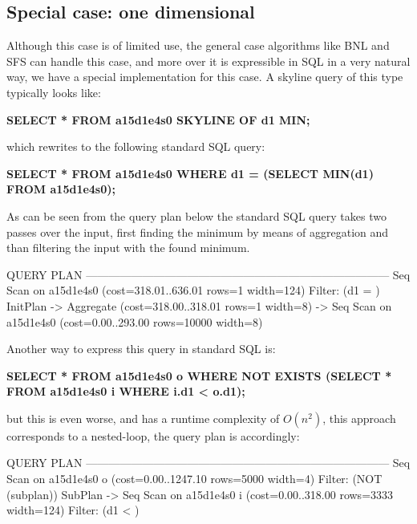 \subsection{Special case: one dimensional}
\label{sec:onedim-nondistinct}
Although this case is of limited use, the general case algorithms like
BNL and SFS can handle this case, and more over it is expressible in
SQL in a very natural way, we have a special implementation for this
case.  A skyline query of this type typically looks like:

\begin{interactive}
\textbf{SELECT * FROM a15d1e4s0 SKYLINE OF d1 MIN;}
\end{interactive}

\noindent
which rewrites to the following standard SQL query:

\begin{interactive}
\textbf{SELECT * FROM a15d1e4s0 WHERE d1 = (SELECT MIN(d1) FROM a15d1e4s0);}
\end{interactive}

\noindent
As can be seen from the query plan below the standard SQL query takes
two passes over the input, first finding the minimum by means of
aggregation and than filtering the input with the found minimum.

\begin{interactive}
                                    QUERY PLAN                                   
---------------------------------------------------------------------------------
 Seq Scan on a15d1e4s0  (cost=318.01..636.01 rows=1 width=124)
   Filter: (d1 = )
   InitPlan
     ->  Aggregate  (cost=318.00..318.01 rows=1 width=8)
           ->  Seq Scan on a15d1e4s0  (cost=0.00..293.00 rows=10000 width=8)
\end{interactive}

\noindent
Another way to express this query in standard SQL is:

\begin{interactive}
\textbf{SELECT * FROM a15d1e4s0 o WHERE NOT EXISTS
    (SELECT * FROM a15d1e4s0 i WHERE i.d1 < o.d1);}
\end{interactive}

\noindent
but this is even worse, and has a runtime complexity of $O(n^2)$, this
approach corresponds to a \naive nested-loop, the query plan is
accordingly:

\begin{interactive}
                                    QUERY PLAN                                   
---------------------------------------------------------------------------------
 Seq Scan on a15d1e4s0 o  (cost=0.00..1247.10 rows=5000 width=4)
   Filter: (NOT (subplan))
   SubPlan
     ->  Seq Scan on a15d1e4s0 i  (cost=0.00..318.00 rows=3333 width=124)
           Filter: (d1 < )
\end{interactive}

